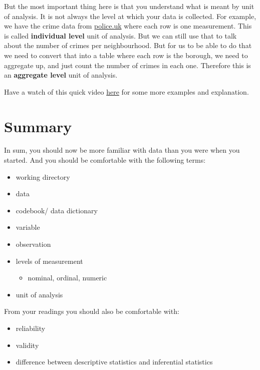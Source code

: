 \documentclass[
]{book}
\providecommand{\tightlist}{%
  \setlength{\itemsep}{0pt}\setlength{\parskip}{0pt}}
\begin{document}
But the most important thing here is that you understand what is meant by unit of analysis. It is not always the level at which your data is collected. For example, we have the crime data from \url{police.uk} where each row is one measurement. This is called \textbf{individual level} unit of analysis. But we can still use that to talk about the number of crimes per neighbourhood. But for us to be able to do that we need to convert that into a table where each row is the borough, we need to aggregate up, and just count the number of crimes in each one. Therefore this is an \textbf{aggregate level} unit of analysis.

Have a watch of this quick video \href{https://www.youtube.com/watch?v=XHXTR8jeEUg}{here} for some more examples and explanation.

\hypertarget{summary}{%
\section{Summary}\label{summary}}

In sum, you should now be more familiar with data than you were when you started. And you should be comfortable with the following terms:

\begin{itemize}
\tightlist
\item
  working directory
\item
  data
\item
  codebook/ data dictionary
\item
  variable
\item
  observation
\item
  levels of measurement

  \begin{itemize}
  \tightlist
  \item
    nominal, ordinal, numeric
  \end{itemize}
\item
  unit of analysis
\end{itemize}

From your readings you should also be comfortable with:

\begin{itemize}
\tightlist
\item
  reliability
\item
  validity
\item
  difference between descriptive statistics and inferential statistics
\end{itemize}
\end{document}
